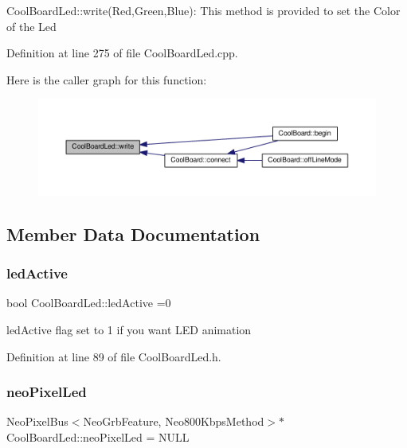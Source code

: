 Cool\+Board\+Led\+::write(\+Red,\+Green,\+Blue)\+: This method is provided to set the Color of the Led 

Definition at line 275 of file Cool\+Board\+Led.\+cpp.

Here is the caller graph for this function\+:\nopagebreak
\begin{figure}[H]
\begin{center}
\leavevmode
\includegraphics[width=350pt]{class_cool_board_led_a30fadd4cbec17ceea428bf7a32207e87_icgraph}
\end{center}
\end{figure}


\subsection{Member Data Documentation}
\mbox{\label{class_cool_board_led_aadd04d2ecf123247718d77f42fba7f08}} 
\subsubsection{\texorpdfstring{led\+Active}{ledActive}}
{\footnotesize\ttfamily bool Cool\+Board\+Led\+::led\+Active =0\hspace{0.3cm}{\ttfamily [private]}}

led\+Active flag set to 1 if you want L\+ED animation 

Definition at line 89 of file Cool\+Board\+Led.\+h.

\mbox{\label{class_cool_board_led_ac2c13fa462a010cd9242bf297c013923}} 
\subsubsection{\texorpdfstring{neo\+Pixel\+Led}{neoPixelLed}}
{\footnotesize\ttfamily Neo\+Pixel\+Bus$<$Neo\+Grb\+Feature, Neo800\+Kbps\+Method$>$$\ast$ Cool\+Board\+Led\+::neo\+Pixel\+Led = N\+U\+LL\hspace{0.3cm}{\ttfamily [private]}}

